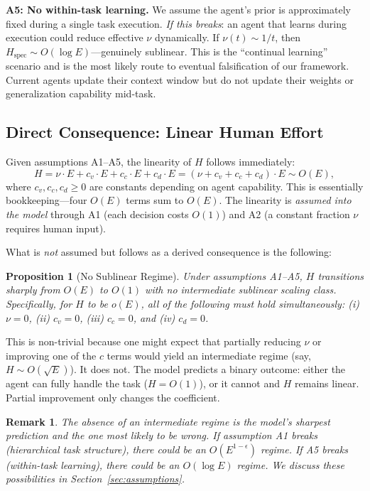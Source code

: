 \documentclass[11pt,a4paper]{article}
\newtheorem{proposition}{Proposition}
\newtheorem{remark}{Remark}
\begin{document}
\textbf{A5: No within-task learning.} We assume the agent's prior is approximately fixed during a single task execution. \emph{If this breaks}: an agent that learns during execution could reduce effective $\nu$ dynamically. If $\nu(t) \sim 1/t$, then $H_{\text{spec}} \sim O(\log E)$---genuinely sublinear. This is the ``continual learning'' scenario and is the most likely route to eventual falsification of our framework. Current agents update their context window but do not update their weights or generalization capability mid-task.

\subsection{Direct Consequence: Linear Human Effort}

Given assumptions A1--A5, the linearity of $H$ follows immediately:
\begin{equation}
H = \nu \cdot E + c_v \cdot E + c_c \cdot E + c_d \cdot E = (\nu + c_v + c_c + c_d) \cdot E \sim O(E),
\end{equation}
where $c_v, c_c, c_d \geq 0$ are constants depending on agent capability. This is essentially bookkeeping---four $O(E)$ terms sum to $O(E)$. The linearity is \emph{assumed into the model} through A1 (each decision costs $O(1)$) and A2 (a constant fraction $\nu$ requires human input).

What is \emph{not} assumed but follows as a derived consequence is the following:

\begin{proposition}[No Sublinear Regime]
Under assumptions A1--A5, $H$ transitions sharply from $O(E)$ to $O(1)$ with no intermediate sublinear scaling class. Specifically, for $H$ to be $o(E)$, \emph{all} of the following must hold simultaneously: (i) $\nu = 0$, (ii) $c_v = 0$, (iii) $c_c = 0$, and (iv) $c_d = 0$.
\end{proposition}

This is non-trivial because one might expect that partially reducing $\nu$ or improving one of the $c$ terms would yield an intermediate regime (say, $H \sim O(\sqrt{E})$). It does not. The model predicts a binary outcome: either the agent can fully handle the task ($H = O(1)$), or it cannot and $H$ remains linear. Partial improvement only changes the coefficient.

\begin{remark}
The absence of an intermediate regime is the model's sharpest prediction and the one most likely to be wrong. If assumption A1 breaks (hierarchical task structure), there could be an $O(E^{1-\epsilon})$ regime. If A5 breaks (within-task learning), there could be an $O(\log E)$ regime. We discuss these possibilities in Section~\ref{sec:assumptions}.
\end{remark}
\end{document}
